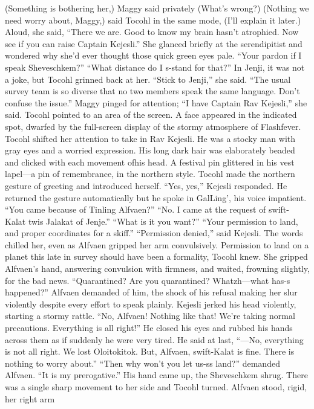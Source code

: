 \documentclass[9pt]{article}
\begin{document}
(Something is bothering her,) Maggy said privately (What’s wrong?)
(Nothing we need worry about, Maggy,) said Tocohl in the same mode, (I’ll explain it later.) Aloud,
she said, “There we are. Good to know my brain hasn’t atrophied. Now see if you can raise Captain
Kejesli.”
She glanced briefly at the serendipitist and wondered why she’d ever thought those quick green eyes
pale. “Your pardon if I speak Sheveschkem?”
“What distance do I s-stand for that?”
In Jenji, it was not a joke, but Tocohl grinned back at her. “Stick to Jenji,” she said. “The usual
survey team is so diverse that no two members speak the same language. Don’t confuse the issue.”
Maggy pinged for attention; “I have Captain Rav Kejesli,” she said. Tocohl pointed to an area of the
screen.
A face appeared in the indicated spot, dwarfed by the full-screen display of the stormy atmosphere
of Flashfever. Tocohl shifted her attention to take in Rav Kejesli. He was a stocky man with gray eyes
and a worried expression. His long dark hair was elaborately beaded and clicked with each movement ofhis head. A festival pin glittered in his vest lapel—a pin of remembrance, in the northern style.
Tocohl made the northern gesture of greeting and introduced herself.
“Yes, yes,” Kejesli responded. He returned the gesture automatically but he spoke in GalLing’, his
voice impatient. “You came because of Tinling Alfvaen?”
“No. I came at the request of swift-Kalat twis Jalakat of Jenje.”
“What is it you want?”
“Your permission to land, and proper coordinates for a skiff.”
“Permission denied,” said Kejesli.
The words chilled her, even as Alfvaen gripped her arm convulsively. Permission to land on a planet
this late in survey should have been a formality, Tocohl knew. She gripped Alfvaen’s hand, answering
convulsion with firmness, and waited, frowning slightly, for the bad news.
“Quarantined? Are you quarantined? Whatzh—what has-s happened?” Alfvaen demanded of him,
the shock of his refusal making her slur violently despite every effort to speak plainly.
Kejesli jerked his head violently, starting a stormy rattle. “No, Alfvaen! Nothing like that! We’re
taking normal precautions. Everything is all right!” He closed his eyes and rubbed his hands across them
as if suddenly he were very tired.
He said at last, “—No, everything is not all right. We lost Oloitokitok. But, Alfvaen, swift-Kalat is
fine. There is nothing to worry about.”
“Then why won’t you let us-ss land?” demanded Alfvaen.
“It is my prerogative.” His hand came up, the Sheveschkem shrug.
There was a single sharp movement to her side and Tocohl turned. Alfvaen stood, rigid, her right arm
\end{document}

